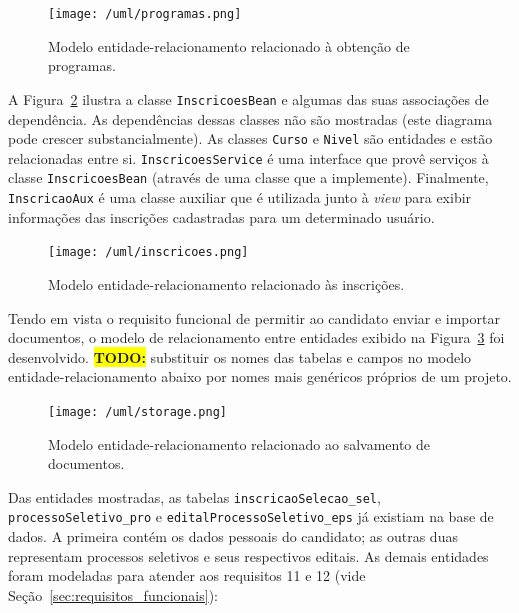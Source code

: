\documentclass[
  10.5pt,				  %
	openright,			%
	twoside,			  %
  a5paper,
  chapter=TITLE,	%
	section=TITLE,	%
  hyphens,        %
	english,        %
	brazil          %
]{abntex2}
\begin{document}
\begin{figure}[!ht]
  \caption{\label{fig:uml_classes1} Modelo entidade-relacionamento relacionado à obtenção de programas. }
  \begin{center}
    \texttt{[image: /uml/programas.png]}
  \end{center}
\end{figure}

A Figura~\ref{fig:uml_classes2} ilustra a classe \texttt{InscricoesBean} e algumas das suas associações de dependência. As dependências dessas classes não são mostradas (este diagrama pode crescer substancialmente). As classes \texttt{Curso} e \texttt{Nivel} são entidades e estão relacionadas entre si. \texttt{InscricoesService} é uma interface que provê serviços à classe \texttt{InscricoesBean} (através de uma classe que a implemente). Finalmente, \texttt{InscricaoAux} é uma classe auxiliar que é utilizada junto à \emph{view} para exibir informações das inscrições cadastradas para um determinado usuário.

\begin{landscape}
\begin{figure}[!ht]
  \caption{\label{fig:uml_classes2} Modelo entidade-relacionamento relacionado às inscrições. }
  \begin{center}
    \texttt{[image: /uml/inscricoes.png]}
  \end{center}
\end{figure}
\end{landscape}

Tendo em vista o requisito funcional de permitir ao candidato enviar e importar documentos, o modelo de relacionamento entre entidades exibido na Figura~\ref{fig:uml_storage} foi desenvolvido. \colorbox{yellow}{\textbf{TODO:}} substituir os nomes das tabelas e campos no modelo entidade-relacionamento abaixo por nomes mais genéricos próprios de um projeto.

\begin{figure}[!ht]
  \caption{\label{fig:uml_storage} Modelo entidade-relacionamento relacionado ao salvamento de documentos. }
  \begin{center}
    \texttt{[image: /uml/storage.png]}
  \end{center}
\end{figure}


Das entidades mostradas, as tabelas \texttt{inscricaoSelecao\_sel}, \texttt{processoSeletivo\_pro} e \texttt{editalProcessoSeletivo\_eps} já existiam na base de dados. A primeira contém os dados pessoais do candidato; as outras duas representam processos seletivos e seus respectivos editais. As demais entidades foram modeladas para atender aos requisitos 11 e 12 (vide Seção~\ref{sec:requisitos_funcionais}):
\end{document}

